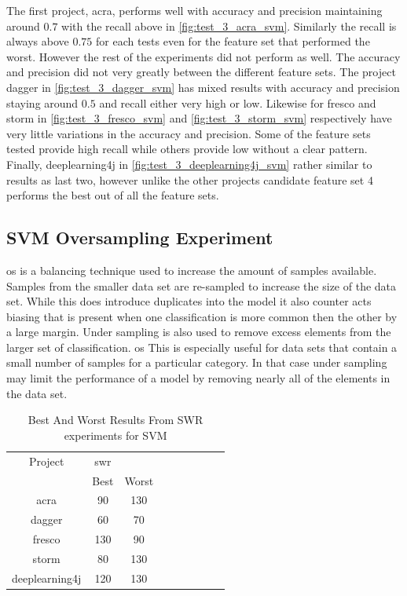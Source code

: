 The first project, acra, performs well with accuracy and precision maintaining around $0.7$ with the recall above in \autoref{fig:test_3_acra_svm}. Similarly the recall is always above $0.75$ for each tests even for the feature set that performed the worst. However the rest of the experiments did not perform as well. The accuracy and precision did not very greatly between the different feature sets. The project dagger in \autoref{fig:test_3_dagger_svm} has mixed results with accuracy and precision staying around $0.5$ and recall either very high or low. Likewise for fresco and storm in \autoref{fig:test_3_fresco_svm} and \autoref{fig:test_3_storm_svm} respectively have very little variations in the accuracy and precision. Some of the feature sets tested provide high recall while others provide low without a clear pattern. Finally, deeplearning4j in \autoref{fig:test_3_deeplearning4j_svm} rather similar to results as last two, however unlike the other projects candidate feature set 4 performs the best out of all the feature sets.

\subsection{SVM Oversampling Experiment}
\label{sec:svm_os_experiment}

\gls{os} is a balancing technique used to increase the amount of samples available. Samples from the smaller data set are re-sampled to increase the size of the data set. While this does introduce duplicates into the model it also counter acts biasing that is present when one classification is more common then the other by a large margin. Under sampling is also used to remove excess elements from the larger set of classification. \gls{os} This is especially useful for data sets that contain a small number of samples for a particular category. In that case under sampling may limit the performance of a model by removing nearly all of the elements in the data set.

\begin{table}[ht]
\begin{center}

    \begin{tabular}{|c|c|c|c|c|c|c|c|c|}
        \hline
        Project & \multicolumn{1}{c}{\gls{swr}} & \\
         & \multicolumn{1}{c}{Best} & \multicolumn{1}{c|}{Worst} \\
         \hline
        acra & 90 & 130 \\
        dagger & 60 & 70 \\
        fresco & 130 & 90 \\
        storm & 80 & 130 \\
        deeplearning4j & 120 & 130 \\ \hline
    \end{tabular}
    \caption{Best And Worst Results From SWR experiments for SVM}
    \label{tab:svm_best_worst_swr_experiment_sets}
\end{center}
\end{table}

